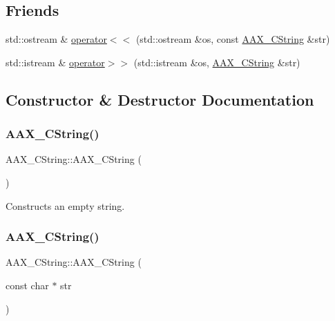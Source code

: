 \subsection*{Friends}
\begin{DoxyCompactItemize}
\item 
std\+::ostream \& \mbox{\hyperlink{a01573_a96d2487d89ed481026b9d07ee7aab5d2}{operator$<$$<$}} (std\+::ostream \&os, const \mbox{\hyperlink{a01573}{A\+A\+X\+\_\+\+C\+String}} \&str)
\item 
std\+::istream \& \mbox{\hyperlink{a01573_a0aeba574cb25673bf03675a39fb7bbe0}{operator$>$$>$}} (std\+::istream \&os, \mbox{\hyperlink{a01573}{A\+A\+X\+\_\+\+C\+String}} \&str)
\end{DoxyCompactItemize}


\subsection{Constructor \& Destructor Documentation}
\mbox{\label{a01573_aaa78b6da31e2540fefdd31f108262bef}} 
\subsubsection{\texorpdfstring{AAX\_CString()}{AAX\_CString()}\hspace{0.1cm}{\footnotesize\ttfamily [1/5]}}
{\footnotesize\ttfamily A\+A\+X\+\_\+\+C\+String\+::\+A\+A\+X\+\_\+\+C\+String (\begin{DoxyParamCaption}{ }\end{DoxyParamCaption})}

Constructs an empty string. \mbox{\label{a01573_acfcad29d78267fd74592edf79bbe4b5d}} 
\subsubsection{\texorpdfstring{AAX\_CString()}{AAX\_CString()}\hspace{0.1cm}{\footnotesize\ttfamily [2/5]}}
{\footnotesize\ttfamily A\+A\+X\+\_\+\+C\+String\+::\+A\+A\+X\+\_\+\+C\+String (\begin{DoxyParamCaption}\item[{const char $\ast$}]{str }\end{DoxyParamCaption})}

